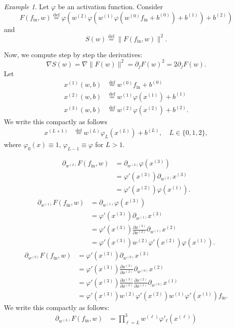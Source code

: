 \documentclass[10pt, a4paper]{article}
\theoremstyle{plain}
\theoremstyle{definition}
\theoremstyle{definition}
\theoremstyle{definition}
\theoremstyle{definition}
\theoremstyle{definition}
\theoremstyle{definition}
\theoremstyle{definition}
\theoremstyle{remark}
\theoremstyle{remark}
\newtheorem{example}[theorem]{Example}
\theoremstyle{rudin-style-generic}
\theoremstyle{rudin-style-generic*}
\theoremstyle{rudin-style-theorem}
\newcommand{\deq}{\stackrel{\mathrm{def}}{=}}
\begin{document}
\begin{example}
Let $\varphi$ be an activation function.
Consider
$$
F(f_{\text{in}},w) \deq \varphi( w^{(2)} \varphi( w^{(1)} \varphi( w^{(0)} f_{\text{in}} + b^{(0)} ) + b^{(1)} ) + b^{(2)} )
$$
and
$$
S(w) \deq \|F(f_{\text{in}},w)\|^2
.
$$

Now, we compute step by step the derivatives:
$$
\nabla S(w) = \nabla\|F(w)\|^2 = \partial_j  F(w)^2 = 2\partial_j F(w)
.
$$
Let 
\begin{align*}
	x^{(1)}(w,b) &\deq w^{(0)} f_{\text{in}} + b^{(0)}\\
	x^{(2)}(w,b) &\deq w^{(1)} \varphi(x^{(1)}) + b^{(1)}\\
	x^{(3)}(w,b) &\deq w^{(2)} \varphi(x^{(2)}) + b^{(2)}
	.
\end{align*}
We write this compactly as follows
\begin{align*}
	x^{(L+1)} &\deq w^{(L)} \varphi_{L}( x^{(L)} ) + b^{(L)},
	\quad L\in\{0,1,2\}
	,
\end{align*}
where $\varphi_0(x) \equiv 1$, $\varphi_{L-1} \equiv \varphi$ for $L>1$. 





\begin{align*}
	\partial_{w^{(2)}} F(f_{\text{in}}, w)
	&= \partial_{w^{(2)}} \varphi(x^{(3)} )\\
	&= \varphi'(x^{(3)} ) \partial_{w^{(2)}} x^{(3)} \\
	&= \varphi'( x^{(2)} ) \varphi( x^{(1)} )
	.
\end{align*}
\begin{align*}
	\partial_{w^{(1)}} F(f_{\text{in}}, w)
	&= \partial_{w^{(1)}}  \varphi( x^{(3)} ) \\
	&= \varphi'( x^{(3)} ) \partial_{w^{(1)}} x^{(3)} \\
	&= \varphi'( x^{(3)} ) \frac{\partial x^{(3)} }{ \partial x^{(2)} } \partial_{w^{(1)}} x^{(2)} \\
	&=  \varphi'( x^{(3)} ) w^{(2)} \varphi'( x^{(2)} ) \varphi( x^{(1)} ) 
	.
\end{align*}
\begin{align*}
	\partial_{w^{(0)}} F(f_{\text{in}}, w)
	&= \varphi'( x^{(3)} ) \partial_{w^{(0)}} x^{(3)} \\
	&= \varphi'( x^{(3)} ) \frac{\partial x^{(3)}}{\partial x^{(2)}} \partial_{w^{(0)}} x^{(2)} \\
	&= \varphi'( x^{(3)} ) \frac{\partial x^{(3)}}{\partial x^{(2)}} 
			\frac{ \partial x^{(2)} } {\partial x^{(1)} } \partial_{w^{(0)}} x^{(1)} \\
	&= \varphi'( x^{(3)} ) w^{(2)} \varphi'( x^{(2)} ) w^{(1)} \varphi'(x^{(1)} ) f_{\text{in}}
	.
\end{align*}
We write this compactly as follows:
\begin{align*}
	\partial_{w^{(L)}} F( f_{\text{in}}, w )
			&= \prod_{\ell=L}^{3} w^{(\ell)} \varphi'_{\ell}( x^{(\ell)} )
\end{align*}







\end{example}
\end{document}
